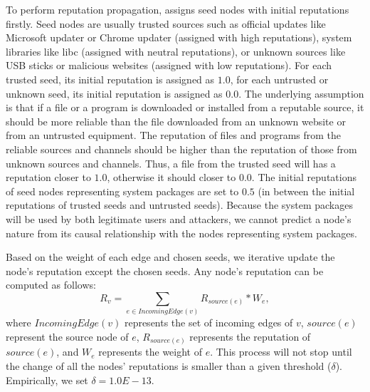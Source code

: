 To perform reputation propagation, \tool assigns seed nodes with initial reputations firstly.
Seed nodes are usually trusted sources such as official updates like Microsoft updater or Chrome updater (assigned with high reputations), system libraries like libc (assigned with neutral reputations), or unknown sources like USB sticks or malicious websites (assigned with low reputations). For each trusted seed, its initial reputation is assigned as $1.0$, for each untrusted or unknown seed, its initial reputation is assigned as $0.0$. The underlying assumption is that if a file or a program is downloaded or installed from a reputable source, it should be more reliable than the file downloaded from an unknown website or from an untrusted equipment. The reputation of files and programs from the reliable sources and channels should be higher than  the reputation of those from unknown sources and channels. Thus, a file from the trusted seed will has a reputation closer to $1.0$, otherwise it should closer to $0.0$. The initial reputations of seed nodes representing system packages are set to $0.5$ (in between the initial reputations of trusted seeds and untrusted seeds). Because the system packages will be used by both legitimate users and attackers, we cannot predict a node's nature from its causal relationship with the nodes representing system packages.

Based on the weight of each edge and chosen seeds, we iterative update the node's reputation except the chosen seeds. Any node's reputation can be computed as follows:  
\begin{equation}
    \label{eq:reputation}
     R_{v} =\sum_{e \in IncomingEdge(v)} R_{source(e)}*W_e,
\end{equation}
where $IncomingEdge(v)$ represents the set of incoming edges of $v$, $source(e)$ represent the source node of $e$, $R_{source(e)}$ represents the reputation of $source(e)$, and $W_e$ represents the weight of $e$.
This process will not stop until the change of all the nodes' reputations is smaller than a given threshold (\eg $\delta$). Empirically, we set $\delta = 1.0E-13 $.  



